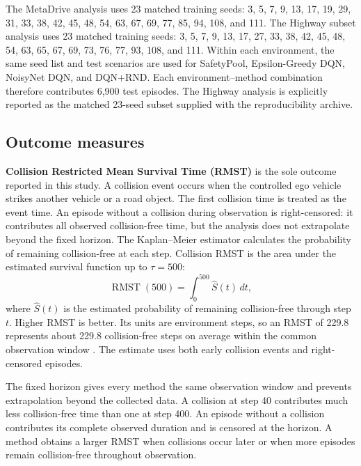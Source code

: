 \documentclass[runningheads]{llncs}
\begin{document}
The MetaDrive analysis uses 23 matched training seeds: \small 3, 5, 7, 9, 13, 17, 19, 29, 31, 33, 38, 42, 45, 48, 54, 63, 67, 69, 77, 85, 94, 108, and 111.\normalsize
The Highway subset analysis uses 23 matched training seeds: \small 3, 5, 7, 9, 13, 17, 27, 33, 38, 42, 45, 48, 54, 63, 65, 67, 69, 73, 76, 77, 93, 108, and 111.\normalsize
Within each environment, the same seed list and test scenarios are used for SafetyPool, Epsilon-Greedy DQN, NoisyNet DQN, and DQN+RND. Each environment--method combination therefore contributes 6,900 test episodes. The Highway analysis is explicitly reported as the matched 23-seed subset supplied with the reproducibility archive.

\subsection{Outcome measures}

\textbf{Collision Restricted Mean Survival Time (RMST)} is the sole outcome reported in this study. A collision event occurs when the controlled ego vehicle strikes another vehicle or a road object. The first collision time is treated as the event time. An episode without a collision during observation is right-censored: it contributes all observed collision-free time, but the analysis does not extrapolate beyond the fixed horizon. The Kaplan--Meier estimator \cite{kaplan1958nonparametric} calculates the probability of remaining collision-free at each step. Collision RMST is the area under the estimated survival function up to $\tau=500$:
\begin{equation}
\operatorname{RMST}(500)=\int_0^{500}\widehat{S}(t)\,dt,
\end{equation}
where $\widehat{S}(t)$ is the estimated probability of remaining collision-free through step $t$. Higher RMST is better. Its units are environment steps, so an RMST of 229.8 represents about 229.8 collision-free steps on average within the common observation window \cite{royston2013rmst}. The estimate uses both early collision events and right-censored episodes.

The fixed horizon gives every method the same observation window and prevents extrapolation beyond the collected data. A collision at step 40 contributes much less collision-free time than one at step 400. An episode without a collision contributes its complete observed duration and is censored at the horizon. A method obtains a larger RMST when collisions occur later or when more episodes remain collision-free throughout observation.
\end{document}
